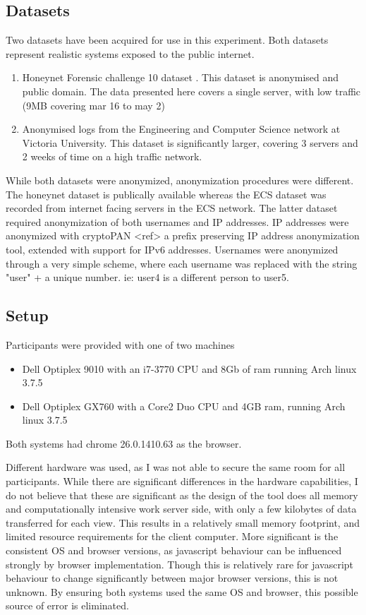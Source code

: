 \subsection{Datasets}\label{data}

Two datasets have been acquired for use in this experiment. Both datasets represent realistic systems exposed to the public internet. 
\begin{enumerate}
\item{Honeynet Forensic challenge 10 dataset \cite{forensic10}. This dataset is anonymised and public domain. The data presented here covers a single server, with low traffic (9MB covering mar 16 to may 2)}
\item{Anonymised logs from the Engineering and Computer Science network at Victoria University. This dataset is significantly larger, covering 3 servers and 2 weeks of time on a high traffic network. }
\end{enumerate}

While both datasets were anonymized, anonymization procedures were different. The honeynet dataset is publically available \cite{forensic10} whereas the ECS dataset was recorded from internet facing servers in the ECS network. The latter dataset required anonymization of both usernames and IP addresses.
IP addresses were anonymized with cryptoPAN <ref> a prefix preserving IP address anonymization tool, extended with support for IPv6 addresses. Usernames were anonymized through a very simple scheme, where each username was replaced with the string "user" + a unique number. ie: user4 is a different person to user5.

\subsection{Setup}
Participants were provided with one of two machines
\begin{itemize}
\item{Dell Optiplex 9010 with an i7-3770 CPU and 8Gb of ram running Arch linux 3.7.5}
\item{Dell Optiplex GX760 with a Core2 Duo CPU and 4GB ram, running Arch linux 3.7.5}
\end{itemize}
Both systems had chrome 26.0.1410.63 as the browser.

Different hardware was used, as I was not able to secure the same room for all participants. 
While there are significant differences in the hardware capabilities, I do not believe that these are significant
as the design of the tool does all memory and computationally intensive work server side, with only a few kilobytes of data transferred for each view. This results in a relatively small memory footprint, and limited resource requirements for the client computer.
More significant is the consistent OS and browser versions, as javascript behaviour can be influenced strongly by browser implementation. Though this is relatively rare for javascript behaviour to change significantly between major browser versions, this is not unknown. By ensuring both systems used the same OS and browser, this possible source of error is eliminated.

